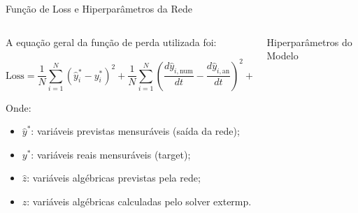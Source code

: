 \begin{frame}{Função de Loss e Hiperparâmetros da Rede}
    \begin{columns}[T]
        \begin{column}{0.55\textwidth}
            \footnotesize
            A equação geral da função de perda utilizada foi:

            \[
            \text{Loss} = \frac{1}{N} \sum_{i=1}^{N} (\hat{y}_i^* - y_i^*)^2
            + \frac{1}{N} \sum_{i=1}^{N} \left( \frac{d\hat{y}_{i,\text{num}}}{dt} - \frac{d\hat{y}_{i,\text{an}}}{dt} \right)^2
            + \frac{1}{N} \sum_{i=1}^{N} (\hat{z}_i - z_i)^2
            \]

            \vspace{0.2cm}
            Onde:
            \begin{itemize}
                \item \( \hat{y}^* \): variáveis previstas mensuráveis (saída da rede);
                \item \( y^* \): variáveis reais mensuráveis (target);
                \item \( \hat{z} \): variáveis algébricas previstas pela rede;
                \item \( z \): variáveis algébricas calculadas pelo solver extermp.
            \end{itemize}
        \end{column}

        \begin{column}{0.45\textwidth}
            \vspace{2cm}
            \begin{block}{\centering Hiperparâmetros do Modelo}
                \footnotesize
                \centering
            \end{block}
        \end{column}
    \end{columns}
\end{frame}

